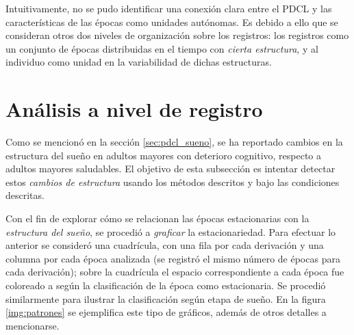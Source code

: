Intuitivamente, no se pudo identificar una conexión clara entre el PDCL y las características de las épocas como unidades autónomas.
%
Es debido a ello que se consideran otros dos niveles de organización sobre los registros: los registros como un conjunto de épocas distribuidas en el tiempo con \textit{cierta estructura}, y al individuo como unidad en la variabilidad de dichas estructuras.


\section{Análisis a nivel de registro}
\label{sec:analisis_registro}

Como se mencionó en la sección \ref{sec:pdcl_sueno}, se ha reportado cambios en la estructura del sueño en adultos mayores con deterioro cognitivo, respecto a adultos mayores saludables.
%
El objetivo de esta subsección es intentar detectar estos \textit{cambios de estructura} usando los métodos descritos y bajo las condiciones descritas.

Con el fin de explorar cómo se relacionan las épocas estacionarias con la \textit{estructura del sueño}, se procedió a \textit{graficar} la estacionariedad.
%
Para efectuar lo anterior se consideró una cuadrícula, con una fila por cada derivación y una columna por cada época analizada (se registró el mismo número de épocas para cada derivación); sobre la cuadrícula el espacio correspondiente a cada época fue coloreado a según la clasificación de la época como estacionaria.
%
Se procedió similarmente para ilustrar la clasificación según etapa de sueño.
%
En la figura \ref{img:patrones} se ejemplifica este tipo de gráficos, además de otros detalles a mencionarse.

